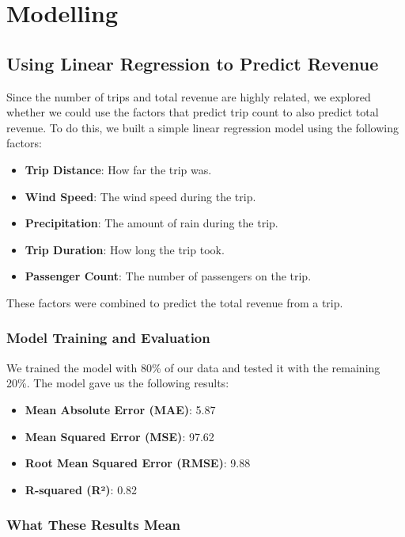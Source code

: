 \documentclass[11pt]{article}
\begin{document}
\section{Modelling}

\subsection{Using Linear Regression to Predict Revenue}

Since the number of trips and total revenue are highly related, we explored whether we could use the factors that predict trip count to also predict total revenue. To do this, we built a simple linear regression model using the following factors:

\begin{itemize}
    \item \textbf{Trip Distance}: How far the trip was.
    \item \textbf{Wind Speed}: The wind speed during the trip.
    \item \textbf{Precipitation}: The amount of rain during the trip.
    \item \textbf{Trip Duration}: How long the trip took.
    \item \textbf{Passenger Count}: The number of passengers on the trip.
\end{itemize}

These factors were combined to predict the total revenue from a trip.

\subsubsection{Model Training and Evaluation}

We trained the model with 80\% of our data and tested it with the remaining 20\%. The model gave us the following results:

\begin{itemize}
    \item \textbf{Mean Absolute Error (MAE)}: 5.87
    \item \textbf{Mean Squared Error (MSE)}: 97.62
    \item \textbf{Root Mean Squared Error (RMSE)}: 9.88
    \item \textbf{R-squared (R²)}: 0.82
\end{itemize}

\subsubsection{What These Results Mean}
\end{document}
